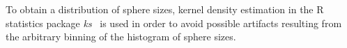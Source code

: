 
To obtain a distribution of sphere sizes, kernel density estimation in the R
statistics package \emph{ks}~\cite{Duong_2007} is used in order to avoid possible artifacts
resulting from the arbitrary binning of the histogram of sphere sizes. 

